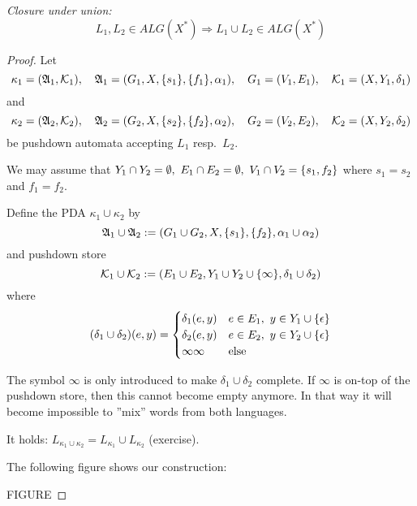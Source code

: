 {\em Closure under union:}
\[ L_1, L_2 \in ALG(X^*) \Rightarrow L_1 \cup L_2 \in ALG(X^*) \]
\begin{proof}
Let
\[ \kappa_1 = (\mbox{$\mathfrak{A}$}_1,\mbox{$\mathcal{K}$}_1),\quad \mbox{$\mathfrak{A}$}_1 = (G_1, X,
\mbox{$\{s_1\}$}, \mbox{$\{f_1\}$}, \alpha_1),\quad G_1 = (V_1, E_1),\quad \mbox{$\mathcal{K}$}_1 =
(X, Y_1, \delta_1)
\]
and
\[ \kappa_2 = (\mbox{$\mathfrak{A}$}_2,\mbox{$\mathcal{K}$}_2),\quad \mbox{$\mathfrak{A}$}_2 = (G_2, X,
\mbox{$\{s_2\}$}, \mbox{$\{f_2\}$}, \alpha_2),\quad G_2 = (V_2, E_2),\quad \mbox{$\mathcal{K}$}_2 =
(X, Y_2, \delta_2)
\]
be pushdown automata accepting $L_1$ resp.\ $L_2$.

We may assume that $Y_1 \cap Y_2 = \emptyset,\ E_1 \cap E_2 =
\emptyset,\ V_1 \cap V_2 = \mbox{$\{s_1, f_2\}$}$ where $s_1 = s_2$ and $f_1 = f_2$.

Define the PDA $\kappa_1 \cup \kappa_2$ by
\[ \mbox{$\mathfrak{A}$}_1 \cup \mbox{$\mathfrak{A}$}_2 := (G_1 \cup G_2, X, \mbox{$\{s_1\}$}, \mbox{$\{f_2\}$},
\alpha_1 \cup \alpha_2) \]
and pushdown store
\[ \mbox{$\mathcal{K}$}_1 \cup \mbox{$\mathcal{K}$}_2 := (E_1 \cup E_2, Y_1 \cup Y_2 \cup
\mbox{$\{\infty\}$}, \delta_1 \cup \delta_2) \]
where
\[ (\delta_1 \cup \delta_2)(e, y) = \begin{cases}
\delta_1(e, y) & e \in E_1,\ y \in Y_1 \cup \mbox{$\{\epsilon\}$} \\ 
\delta_2(e, y) & e \in E_2,\ y \in Y_2 \cup \mbox{$\{\epsilon\}$} \\
\infty\infty & \text{else} 
\end{cases}
\]

The symbol $\infty$ is only introduced to make $\delta_1 \cup \delta_2$
complete. If $\infty$ is on-top of the pushdown store, then this cannot become
empty anymore. In that way it will become impossible to ''mix'' words from both
languages.

It holds: $L_{\kappa_1 \cup \kappa_2} = L_{\kappa_1} \cup L_{\kappa_2}$
(exercise).

The following figure shows our construction:

FIGURE

\end{proof}

